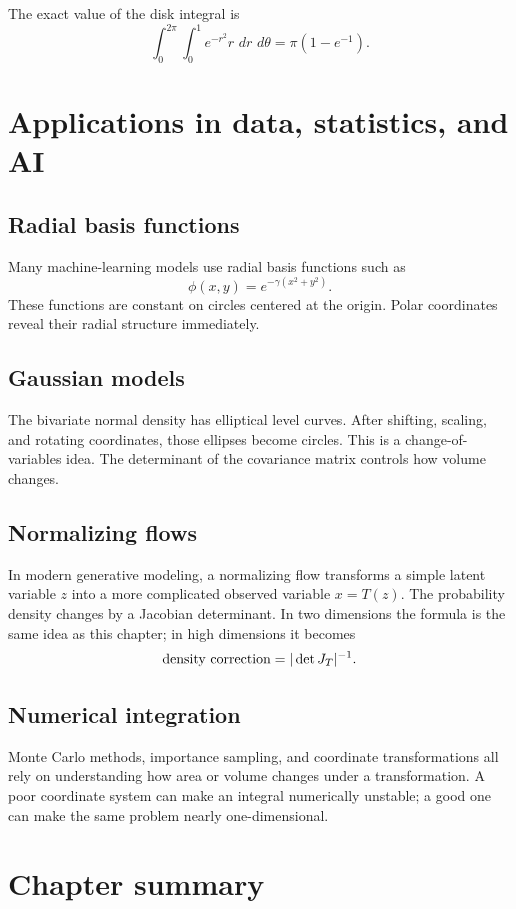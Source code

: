 \documentclass[11pt]{article}
\newcommand{\dd}{\,d}
\begin{document}
The exact value of the disk integral is
\[
\int_0^{2\pi}\int_0^1 e^{-r^2}r\,\dd r\,\dd\theta=\pi(1-e^{-1}).
\]

\section{Applications in data, statistics, and AI}

\subsection*{Radial basis functions}
Many machine-learning models use radial basis functions such as
\[
\phi(x,y)=e^{-\gamma(x^2+y^2)}.
\]
These functions are constant on circles centered at the origin. Polar coordinates reveal their radial structure immediately.

\subsection*{Gaussian models}
The bivariate normal density has elliptical level curves. After shifting, scaling, and rotating coordinates, those ellipses become circles. This is a change-of-variables idea. The determinant of the covariance matrix controls how volume changes.

\subsection*{Normalizing flows}
In modern generative modeling, a normalizing flow transforms a simple latent variable $z$ into a more complicated observed variable $x=T(z)$. The probability density changes by a Jacobian determinant. In two dimensions the formula is the same idea as this chapter; in high dimensions it becomes
\[
\hbox{density correction}=|\det J_T|^{-1}.
\]

\subsection*{Numerical integration}
Monte Carlo methods, importance sampling, and coordinate transformations all rely on understanding how area or volume changes under a transformation. A poor coordinate system can make an integral numerically unstable; a good one can make the same problem nearly one-dimensional.

\section{Chapter summary}
\end{document}
